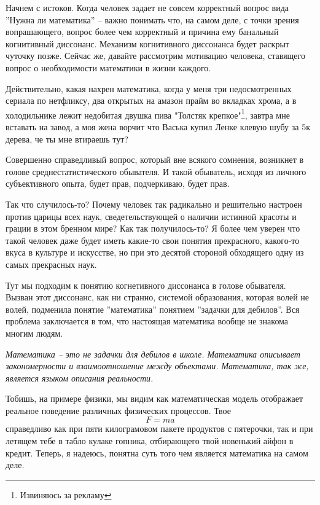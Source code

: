Начнем с истоков.
Когда человек задает не совсем корректный вопрос вида ''Нужна ли математика'' -- важно понимать что, на самом деле,
с точки зрения вопрашающего, вопрос более чем корректный и причина ему банальный когнитивный диссонанс.
Механизм когнитивного диссонанса будет раскрыт чуточку позже.
Сейчас же, давайте рассмотрим мотивацию человека, ставящего вопрос о необходимости математики в жизни каждого.

Действительно, какая нахрен математика, когда у меня три недосмотренных сериала по нетфликсу, два открытых на амазон прайм
во вкладках хрома, а в холодильнике лежит недобитая двушка пива "Толстяк крепкое"\footnote{Извиняюсь за рекламу},
завтра мне вставать на завод, а моя жена ворчит что Васька купил Ленке клевую шубу за 5к дерева, че ты мне втираешь тут?

Совершенно справедливый вопрос, который вне всякого сомнения, возникнет в голове среднестатистического обывателя.
И такой обыватель, исходя из личного субъективного опыта, будет прав, подчеркиваю, будет прав.

Так что случилось-то?
Почему человек так радикально и решительно настроен против царицы всех наук, сведетельствующей о наличии истинной красоты
и грации в этом бренном мире?
Как так получилось-то?
Я более чем уверен что такой человек даже будет иметь какие-то свои понятия прекрасного, какого-то вкуса в культуре и искусстве,
но при это десятой стороной обходящего одну из самых прекрасных наук.

Тут мы подходим к понятию когнетивного диссонанса в голове обывателя.
Вызван этот диссонанс, как ни странно, системой образования, которая волей не волей, подменила понятие ''математика'' понятием
''задачки для дебилов''.
Вся проблема заключается в том, что настоящая математика вообще не знакома многим людям.

\begin{displayquote}
    \textit{
        Математика -- это не задачки для дебилов в школе.
        Математика описывает закономерности и взаимоотношение между объектами.
        Математика, так же, является языком описания реальности.
    }
\end{displayquote}
Тобишь, на примере физики, мы видим как математическая модель отображает реальное поведение различных физических процессов.
Твое
\[F = ma\]
справедливо как при пяти килограмовом пакете продуктов с пятерочки, так и при летящем тебе в табло кулаке гопника,
отбирающего твой новенький айфон в кредит.
Теперь, я надеюсь, понятна суть того чем является математика на самом деле.

